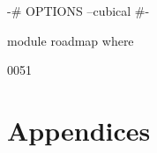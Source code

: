 \documentclass[11pt, a4paper]{article}
\begin{document}
\thispagestyle{empty}

\newpage

\begin{spacing}{0.0}
\tableofcontents
\end{spacing}

\thispagestyle{empty}

\newpage
\setcounter{page}{1}

\begin{code}[hide]
{-# OPTIONS --cubical #-}

module roadmap where
\end{code}

0051









% 














\newpage




\newpage
\section{Appendices}
\end{document}
